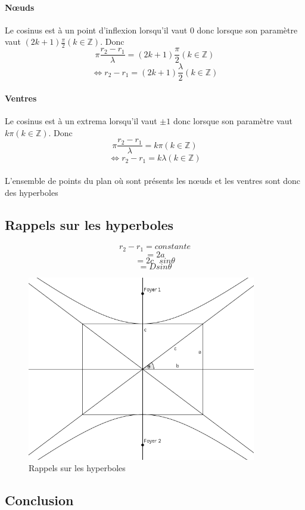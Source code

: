 \documentclass[a4paper]{article}
\begin{document}
\paragraph{Nœuds}Le cosinus est à un point d'inflexion lorsqu'il vaut $0$ donc lorsque son paramètre vaut $(2k+1)\frac{\pi}{2} (k \in \mathbb{Z})$. Donc
\[\pi\frac{r_2-r_1}{\lambda}=(2k+1)\frac{\pi}{2} (k \in \mathbb{Z})\]
\[\Leftrightarrow r_2-r_1=(2k+1)\frac{\lambda}{2} (k \in \mathbb{Z})\]
\paragraph{Ventres}Le cosinus est à un extrema lorsqu'il vaut $\pm1$ donc lorsque son paramètre vaut $k\pi (k \in \mathbb{Z})$. Donc
\[\pi\frac{r_2-r_1}{\lambda}=k\pi (k \in \mathbb{Z})\]
\[\Leftrightarrow r_2-r_1=k\lambda (k \in \mathbb{Z})\]
\paragraph{}L'ensemble de points du plan où sont présents les nœuds et les ventres sont donc des hyperboles
\subsection{Rappels sur les hyperboles}
\[r_2-r_1=constante\]
\[=2a\]
\[=2c\text{ }sin\theta\]
\[=Dsin\theta\]
\begin{figure}
\begin{center}
\includegraphics[width=10cm]{imgs/hyperbole.png}
\end{center}
\caption{Rappels sur les hyperboles}
\label{Rappels sur les hyperboles}
\end{figure}
\subsection{Conclusion}
\end{document}
